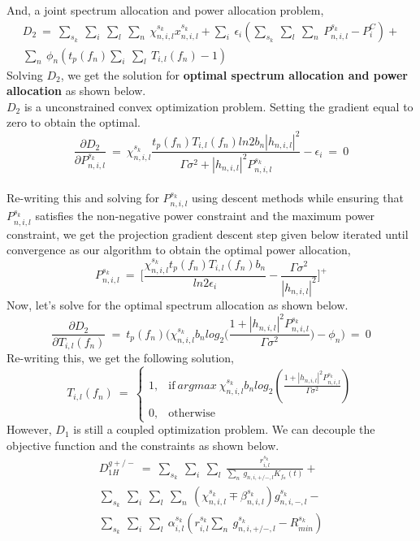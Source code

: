 \documentclass[12pt, draftcls, onecolumn]{IEEEtran}
\begin{document}
And, a joint spectrum allocation and power allocation problem,
\begin{equation}\label{7}
    \begin{aligned}
        D_2\ =\ \sum_{s_k}\ \sum_i\ \sum_l\ \sum_n\ \chi_{n,i,l}^{s_k} x_{n,i,l}^{s_k} + \sum_i\ \epsilon_i(\sum_{s_k}\ \sum_l\ \sum_n\ P_{n,i,l}^{s_k} - P_i^C) + \\\sum_n\ \phi_n(t_p(f_n) \sum_i\ \sum_l\ T_{i,l}(f_n) - 1)
    \end{aligned}
\end{equation}
Solving $D_2$, we get the solution for \textbf{optimal spectrum allocation and power allocation} as shown below.
\\$D_2$ is a unconstrained convex optimization problem. Setting the gradient equal to zero to obtain the optimal.
\[\frac{\partial D_2}{\partial P_{n,i,l}^{s_k}}\ =\ \chi_{n,i,l}^{s_k} \frac{t_p(f_n) T_{i,l}(f_n) ln 2 b_n |h_{n,i,l}|^2}{\Gamma \sigma^2 + |h_{n,i,l}|^2P_{n,i,l}^{s_k}} - \epsilon_i\ =\ 0\]
\\Re-writing this and solving for $P_{n,i,l}^{s_k}$ using descent methods while ensuring that $P_{n,i,l}^{s_k}$ satisfies the non-negative power constraint and the maximum power constraint, we get the projection gradient descent step given below iterated until convergence as our algorithm to obtain the optimal power allocation,
\[P_{n,i,l}^{s_k}\ =\ \Big[\frac{\chi_{n,i,l}^{s_k} t_p(f_n) T_{i,l}(f_n) b_n}{ln2 \epsilon_i} - \frac{\Gamma \sigma^2}{|h_{n,i,l}|^2}\Big]^+\]
Now, let's solve for the optimal spectrum allocation as shown below.
\[\frac{\partial D_2}{\partial T_{i,l}(f_n)}\ =\ t_p(f_n)\Big(\chi_{n,i,l}^{s_k} b_n log_2\Big(\frac{1+|h_{n,i,l}|^2 P_{n,i,l}^{s_k}}{\Gamma \sigma^2}\Big) - \phi_n\Big)\ =\ 0\]
Re-writing this, we get the following solution,
\begin{equation*}
    T_{i,l}(f_n)\ =\ 
    \begin{cases}
        1, & \text{if}\ argmax\ \chi_{n,i,l}^{s_k} b_n log_2(\frac{1+|h_{n,i,l}|^2 P_{n,i,l}^{s_k}}{\Gamma \sigma^2})\\
        0, & \text{otherwise}
    \end{cases}
\end{equation*}
However, $D_1$ is still a coupled optimization problem. We can decouple the objective function and the constraints as shown below.
\begin{equation}
    \begin{aligned}
        D_{1H}^{g+/-}\ =\ \sum_{s_k}\ \sum_{i}\ \sum_{l}\ \frac{r_{i,l}^{s_k}}{\sum_{n}\ g_{n,i,+/-,l} K_{f_n}(t)} + \\\sum_{s_k}\ \sum_i\ \sum_l\ \sum_n\ (\chi_{n,i,l}^{s_k} \mp \beta_{n,i,l}^{s_k})g_{n,i,-,l}^{s_k} - \\\sum_{s_k}\ \sum_{i}\ \sum_{l}\ \alpha_{i,l}^{s_k}(r_{i,l}^{s_k}\sum_n\ g_{n,i,+/-,l}^{s_k} - R_{min}^{s_k})
    \end{aligned}
\end{equation}
\end{document}
